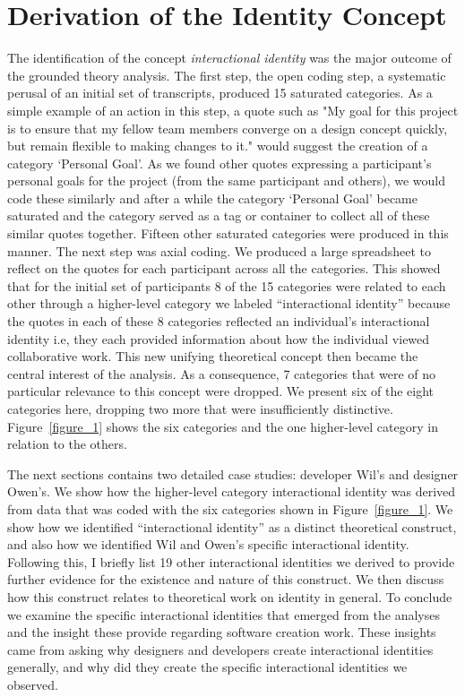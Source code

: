 \documentclass{chi2009}
\begin{document}
\section{Derivation of the Identity Concept}

The identification of the concept {\it interactional identity} was the major outcome of the grounded theory analysis. The first step, the open coding step, a systematic perusal of an initial set of transcripts, produced 15 saturated categories. As a simple example of an action in this step, a quote such as "My goal for this project is to ensure that my fellow team members converge on a design concept quickly, but remain flexible to making changes to it." would suggest the creation of a category `Personal Goal'. As we found other quotes expressing a participant's personal goals for the project (from the same participant and others), we would code these similarly and after a while the category `Personal Goal' became saturated and the category served as a tag or container to collect all of these similar quotes together.  Fifteen other saturated categories were produced in this manner. The next step was axial coding.  We produced a large spreadsheet to reflect on the quotes for each participant across all the categories.  This showed that for the initial set of participants 8 of the 15 categories were related to each other through a higher-level category we labeled ``interactional identity'' because the quotes in each of these 8 categories reflected an individual's interactional identity i.e, they each provided information about how the individual viewed collaborative work.  This new unifying theoretical concept then became the central interest of the analysis. As a consequence, 7 categories that were of no particular relevance to this concept were dropped. We present six of the eight categories here, dropping two more that were insufficiently distinctive. Figure~\ref{figure_1} shows the six categories and the one higher-level category in relation to the others.

The next sections contains two detailed case studies: developer Wil's and designer Owen's. We show how the higher-level category interactional identity was derived from data that was coded with the six categories shown in Figure~\ref{figure_1}.  We show how we identified ``interactional identity'' as a distinct theoretical construct, and also how we identified Wil and Owen's specific interactional identity. Following this, I briefly list 19 other interactional identities we derived to provide further evidence for the existence and nature of this construct.  We then discuss how this construct relates to theoretical work on identity in general.  To conclude we examine the specific interactional identities that emerged from the analyses and the insight these provide regarding software creation work.  These insights came from asking why designers and developers create interactional identities generally, and why did they create the specific interactional identities we observed. 
\end{document}
